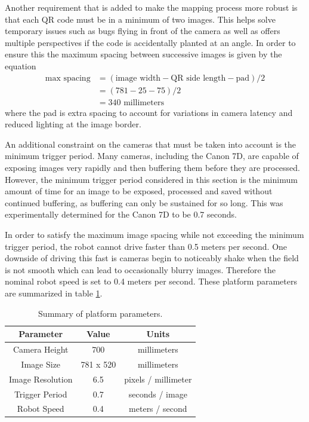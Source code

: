 Another requirement that is added to make the mapping process more robust is that each QR code must be in a minimum of two images.  This helps solve temporary issues such as bugs flying in front of the camera as well as offers multiple perspectives if the code is accidentally planted at an angle.  In order to ensure this the maximum spacing between successive images is given by the equation
\begin{align*}
 \text{max spacing} &= (\text{image width} - \text{QR side length} - \text{pad}) / 2 \\
             &= (781 - 25 - 75) / 2 \\ 
             &= 340 \text{ millimeters}
\end{align*}
where the pad is extra spacing to account for variations in camera latency and reduced lighting at the image border.
  
An additional constraint on the cameras that must be taken into account is the minimum trigger period.  Many cameras, including the Canon 7D, are capable of exposing images very rapidly and then buffering them before they are processed.  However, the minimum trigger period considered in this section is the minimum amount of time for an image to be exposed, processed and saved without continued buffering, as buffering can only be sustained for so long.  This was experimentally determined for the Canon 7D to be 0.7 seconds.  

In order to satisfy the maximum image spacing while not exceeding the minimum trigger period, the robot cannot drive faster than 0.5 meters per second.  One downside of driving this fast is cameras begin to noticeably shake when the field is not smooth which can lead to occasionally blurry images.  Therefore the nominal robot speed is set to 0.4 meters per second.  These platform parameters are summarized in table \ref{table:platform_params}.


\begin{table}[htb]
    \begin{center}
    \caption{Summary of platform parameters.}
    \begin{tabular}[c]{|c|c|c|}
        \hline
        Parameter & Value & Units \\
        \hline
        Camera Height    & 700       & millimeters         \\
        Image Size       & 781 x 520 & millimeters         \\
        Image Resolution & 6.5       & pixels / millimeter \\
        Trigger Period   & 0.7       & seconds / image     \\
        Robot Speed      & 0.4       & meters / second     \\
        \hline
    \end{tabular}
    \label{table:platform_params}
   \end{center}
\end{table}

